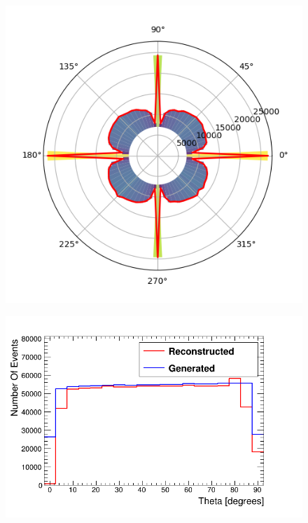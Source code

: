 \begin{figure}[htbp]
 \centering
 \includegraphics[width=0.6\linewidth]{Chapter5/Figs/Raster/cosmicSimpleHemNoDead_Ciruclarphi.png}
 \label{fig:cirPhiGenVsRecoHem}
\end{figure}


\begin{figure}[htbp]
 \centering
 \includegraphics[width=0.8\linewidth]{Chapter5/Figs/Raster/hemisphereThetaCompare.png}
 \label{fig:thetaGenVsRecoHem}
\end{figure}

